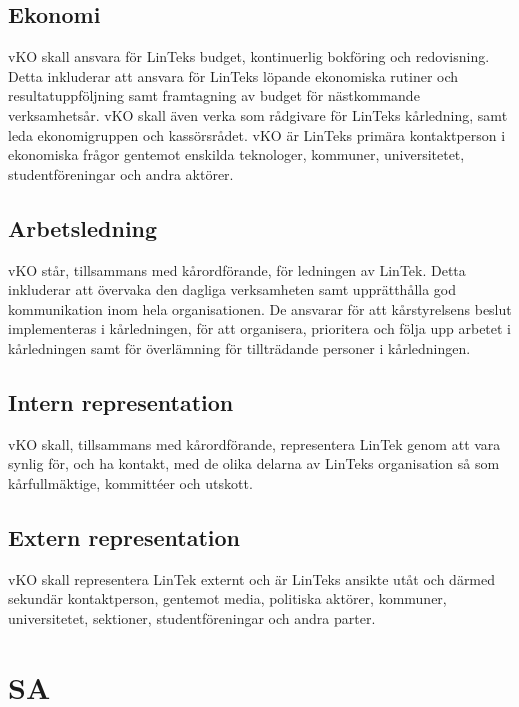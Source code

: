 \hypertarget{ekonomi}{%
\subsection{Ekonomi}\label{ekonomi}}

vKO skall ansvara för LinTeks budget, kontinuerlig bokföring och
redovisning. Detta inkluderar att ansvara för LinTeks löpande ekonomiska
rutiner och resultatuppföljning samt framtagning av budget för
nästkommande verksamhetsår. vKO skall även verka som rådgivare för
LinTeks kårledning, samt leda ekonomigruppen och kassörsrådet. vKO är
LinTeks primära kontaktperson i ekonomiska frågor gentemot enskilda
teknologer, kommuner, universitetet, studentföreningar och andra
aktörer.

\hypertarget{arbetsledning}{%
\subsection{Arbetsledning}\label{arbetsledning}}

vKO står, tillsammans med kårordförande, för ledningen av LinTek. Detta
inkluderar att övervaka den dagliga verksamheten samt upprätthålla god
kommunikation inom hela organisationen. De ansvarar för att
kårstyrelsens beslut implementeras i kårledningen, för att organisera,
prioritera och följa upp arbetet i kårledningen samt för överlämning för
tillträdande personer i kårledningen.

\hypertarget{intern-representation}{%
\subsection{Intern representation}\label{intern-representation}}

vKO skall, tillsammans med kårordförande, representera LinTek genom att
vara synlig för, och ha kontakt, med de olika delarna av LinTeks
organisation så som kårfullmäktige, kommittéer och utskott.

\hypertarget{extern-representation-1}{%
\subsection{Extern representation}\label{extern-representation-1}}

vKO skall representera LinTek externt och är LinTeks ansikte utåt och
därmed sekundär kontaktperson, gentemot media, politiska aktörer,
kommuner, universitetet, sektioner, studentföreningar och andra parter.

\hypertarget{sa}{%
\section{SA}\label{sa}}

